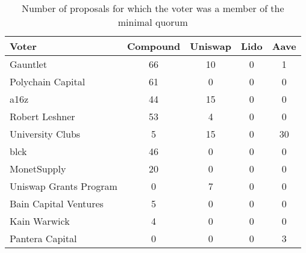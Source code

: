 \begin{table}
\centering
\caption{Number of proposals for which the voter was a member of the minimal quorum}
\label{tab:category_counts}
\begin{tabular}{|l|c|c|c|c|}
\hline
Voter & Compound & Uniswap & Lido & Aave \\ \hline

Gauntlet & 66 & 10 & 0 & 1 \\ \hline
Polychain Capital & 61 & 0 & 0 & 0 \\ \hline
a16z & 44 & 15 & 0 & 0 \\ \hline
Robert Leshner & 53 & 4 & 0 & 0 \\ \hline
University Clubs & 5 & 15 & 0 & 30 \\ \hline
blck & 46 & 0 & 0 & 0 \\ \hline
MonetSupply & 20 & 0 & 0 & 0 \\ \hline
Uniswap Grants Program & 0 & 7 & 0 & 0 \\ \hline
Bain Capital Ventures & 5 & 0 & 0 & 0 \\ \hline
Kain Warwick & 4 & 0 & 0 & 0 \\ \hline
Pantera Capital & 0 & 0 & 0 & 3 \\ \hline

\end{tabular}
\end{table}
